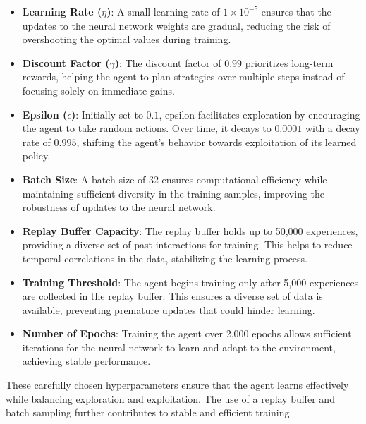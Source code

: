 \documentclass[a4paper,12pt]{article}
\begin{document}
\begin{itemize}
    \item \textbf{Learning Rate (\(\eta\))}: A small learning rate of \(1 \times 10^{-5}\) ensures that the updates to the neural network weights are gradual, reducing the risk of overshooting the optimal values during training.

    \item \textbf{Discount Factor (\(\gamma\))}: The discount factor of \(0.99\) prioritizes long-term rewards, helping the agent to plan strategies over multiple steps instead of focusing solely on immediate gains.

    \item \textbf{Epsilon (\(\epsilon\))}: 
    Initially set to \(0.1\), epsilon facilitates exploration by encouraging the agent to take random actions. Over time, it decays to \(0.0001\) with a decay rate of \(0.995\), shifting the agent's behavior towards exploitation of its learned policy.

    \item \textbf{Batch Size}: A batch size of 32 ensures computational efficiency while maintaining sufficient diversity in the training samples, improving the robustness of updates to the neural network.

    \item \textbf{Replay Buffer Capacity}: The replay buffer holds up to 50,000 experiences, providing a diverse set of past interactions for training. This helps to reduce temporal correlations in the data, stabilizing the learning process.

    \item \textbf{Training Threshold}: The agent begins training only after 5,000 experiences are collected in the replay buffer. This ensures a diverse set of data is available, preventing premature updates that could hinder learning.

    \item \textbf{Number of Epochs}: Training the agent over 2,000 epochs allows sufficient iterations for the neural network to learn and adapt to the environment, achieving stable performance.

\end{itemize}

These carefully chosen hyperparameters ensure that the agent learns effectively while balancing exploration and exploitation. The use of a replay buffer and batch sampling further contributes to stable and efficient training.
\end{document}
